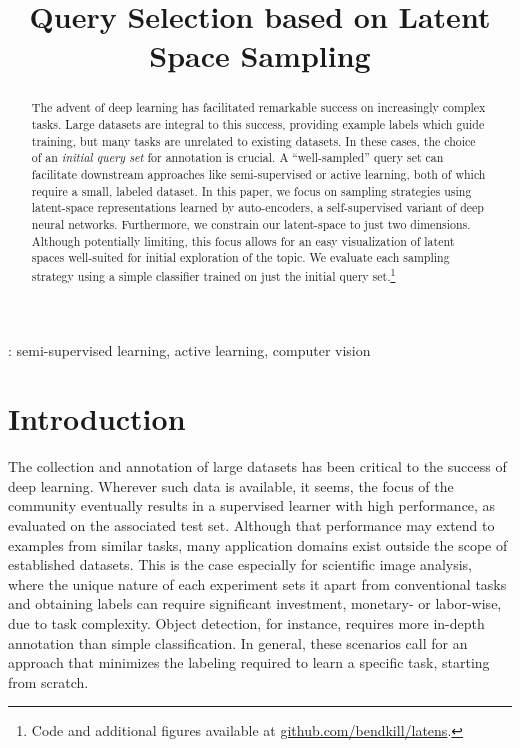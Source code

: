 \documentclass[a4paper]{article}
\title{Query Selection based on Latent Space Sampling}
\begin{document}
\maketitle

\begin{abstract}
  The advent of deep learning has facilitated remarkable success on increasingly
  complex tasks. Large datasets are integral to this success, providing example
  labels which guide training, but many tasks are unrelated to existing
  datasets. In these cases, the choice of an \emph{initial query set} for
  annotation is crucial. A ``well-sampled'' query set can facilitate downstream
  approaches like semi-supervised or active learning, both of which require a
  small, labeled dataset. In this paper, we focus on sampling strategies using
  latent-space representations learned by auto-encoders, a self-supervised
  variant of deep neural networks. Furthermore, we constrain our latent-space to
  just two dimensions. Although potentially limiting, this focus allows for an
  easy visualization of latent spaces well-suited for initial exploration of the
  topic. We evaluate each sampling strategy using a simple classifier trained on
  just the initial query set.\footnote{Code and additional figures available at
    \href{https://github.com/bendkill/latens}{github.com/bendkill/latens}.}
\end{abstract}
: semi-supervised learning, active learning, computer
vision

\section{Introduction}
\label{sec:introduction}

The collection and annotation of large datasets has been critical to the success
of deep learning. Wherever such data is available, it seems, the focus of the
community eventually results in a supervised learner with high performance, as
evaluated on the associated test set. Although that performance may extend to
examples from similar tasks, many application domains exist outside the scope of
established datasets. This is the case especially for scientific image analysis,
where the unique nature of each experiment sets it apart from conventional tasks
and obtaining labels can require significant investment, monetary- or
labor-wise, due to task complexity. Object detection, for instance, requires
more in-depth annotation than simple classification. In general, these scenarios
call for an approach that minimizes the labeling required to learn a specific
task, starting from scratch.
\end{document}
